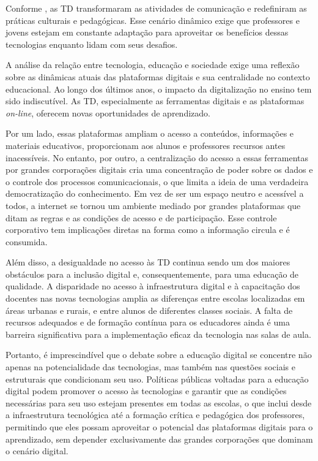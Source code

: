 \documentclass[portuguese]{textolivre}
\begin{document}
Conforme \textcite{barton2015}, as TD transformaram as atividades de comunicação e redefiniram as práticas culturais e pedagógicas. Esse cenário dinâmico exige que professores e jovens estejam em constante adaptação para aproveitar os benefícios dessas tecnologias enquanto lidam com seus desafios.

A análise da relação entre tecnologia, educação e sociedade exige uma reflexão sobre as dinâmicas atuais das plataformas digitais e sua centralidade no contexto educacional. Ao longo dos últimos anos, o impacto da digitalização no ensino tem sido indiscutível. As TD, especialmente as ferramentas digitais e as plataformas \textit{on-line}, oferecem novas oportunidades de aprendizado.

Por um lado, essas plataformas ampliam o acesso a conteúdos, informações e materiais educativos, proporcionam aos alunos e professores recursos antes inacessíveis. No entanto, por outro, a centralização do acesso a essas ferramentas por grandes corporações digitais cria uma concentração de poder sobre os dados e o controle dos processos comunicacionais, o que limita a ideia de uma verdadeira democratização do conhecimento. Em vez de ser um espaço neutro e acessível a todos, a internet se tornou um ambiente mediado por grandes plataformas que ditam as regras e as condições de acesso e de participação. Esse controle corporativo tem implicações diretas na forma como a informação circula e é consumida.

Além disso, a desigualdade no acesso às TD continua sendo um dos maiores obstáculos para a inclusão digital e, consequentemente, para uma educação de qualidade. A disparidade no acesso à infraestrutura digital e à capacitação dos docentes nas novas tecnologias amplia as diferenças entre escolas localizadas em áreas urbanas e rurais, e entre alunos de diferentes classes sociais. A falta de recursos adequados e de formação contínua para os educadores ainda é uma barreira significativa para a implementação eficaz da tecnologia nas salas de aula.

Portanto, é imprescindível que o debate sobre a educação digital se concentre não apenas na potencialidade das tecnologias, mas também nas questões sociais e estruturais que condicionam seu uso. Políticas públicas voltadas para a educação digital podem promover o acesso às tecnologias e garantir que as condições necessárias para seu uso estejam presentes em todas as escolas, o que inclui desde a infraestrutura tecnológica até a formação crítica e pedagógica dos professores, permitindo que eles possam aproveitar o potencial das plataformas digitais para o aprendizado, sem depender exclusivamente das grandes corporações que dominam o cenário digital.
\end{document}
